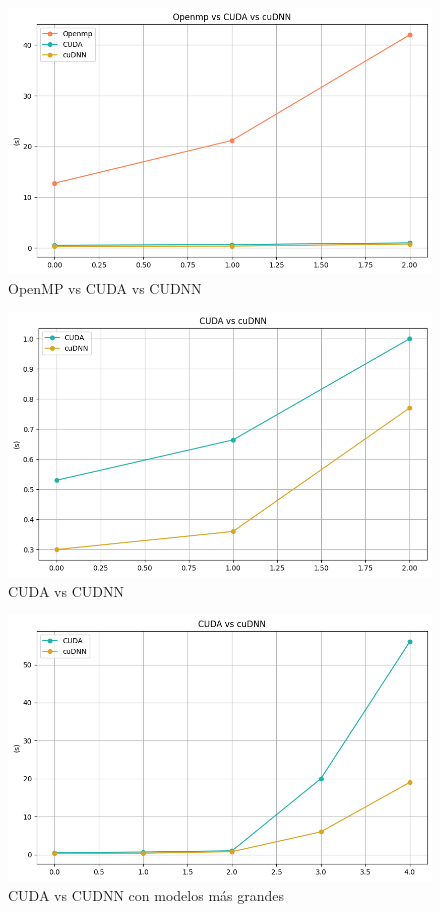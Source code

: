 \begin{figure}[H]
	\centering
	\includegraphics[scale=0.5]{imagenes/openmp_cuda_cudnn.png}  
	\caption{OpenMP vs CUDA vs CUDNN}
	\label{fig:openmp_cuda_cudnn}
\end{figure}

\begin{figure}[H]
	\centering
	\includegraphics[scale=0.5]{imagenes/cuda_cudnn_1.png}  
	\caption{CUDA vs CUDNN}
	\label{fig:cuda_cudnn_1}
\end{figure}

\begin{figure}[H]
	\centering
	\includegraphics[scale=0.5]{imagenes/cuda_cudnn_2.png}  
	\caption{CUDA vs CUDNN con modelos más grandes}
	\label{fig:cuda_cudnn_2}
\end{figure}
